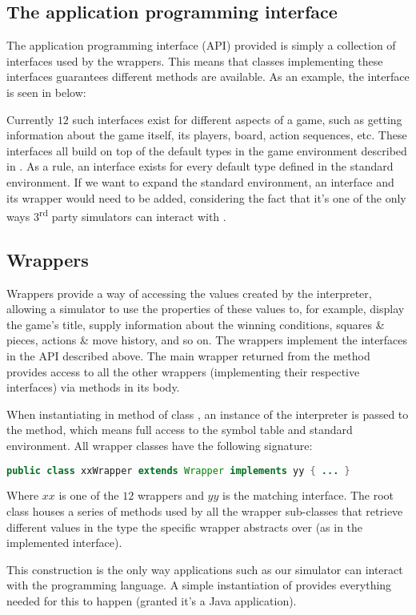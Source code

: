 \subsection{The application programming interface}
The application programming interface (API) provided is simply a collection of interfaces used by the wrappers. This means that classes implementing these interfaces guarantees different methods are available. As an example, the  interface is seen in  below:



Currently $12$ such interfaces exist for different aspects of a game,
such as getting information about the game itself, its players, board,
action sequences, etc. These interfaces all build on top of the default
types in the game environment described in . As a
rule, an interface exists for every default type defined in the standard
environment. If we want to expand the standard environment, an interface
and its wrapper would need to be added, considering the fact that it's
one of the only ways 3\textsuperscript{rd} party simulators can interact
with \productname{}.

\subsection{Wrappers}
Wrappers provide a way of accessing the values created by the
interpreter, allowing a simulator to use the properties of these
values to, for example, display the game's title, supply information
about the winning conditions, squares \& pieces, actions \& move
history, and so on. The wrappers implement the interfaces in the
API described above. The main wrapper returned from the method
 provides access to all the other wrappers
(implementing their respective interfaces) via methods in its body.

When instantiating  in method 
of class , an instance of the interpreter
is passed to the method, which means full access to the symbol table and
standard environment. All wrapper classes have the following signature:

\begin{lstlisting}[language=Java,caption={\emph{The signaure of all API wrapper classes.}}]
  public class xxWrapper extends Wrapper implements yy { ... }
\end{lstlisting}

Where $xx$ is one of the $12$ wrappers and $yy$ is the matching
interface. The root class  houses a series of methods
used by all the wrapper sub-classes that retrieve different values in
the type the specific wrapper abstracts over (as in the implemented
interface).

This construction is the only way applications such as our simulator
can interact with the programming language. A simple instantiation of
 provides everything needed for this to
happen (granted it's a Java application).
